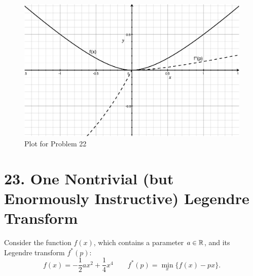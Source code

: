 \documentclass[a4paper,twoside]{article}
\begin{document}
\begin{figure}[h]
    \centering
    \includegraphics[width=\textwidth]{Problem_22_Plot.eps}
    \caption{Plot for Problem 22}
    \label{fig:problem_22_plot}
\end{figure}

\section*{23. One Nontrivial (but Enormously Instructive) Legendre Transform}
Consider the function $ f(x) $, which contains a parameter $ a \in \mathbb{R} $, and its Legendre transform $ f^*(p) $:
\begin{equation}
    f(x) = - \frac{1}{2} ax^2 + \frac{1}{4} x^4 \qquad f^*(p) = \min_x \{f(x) - px\}.
\end{equation}
\end{document}
